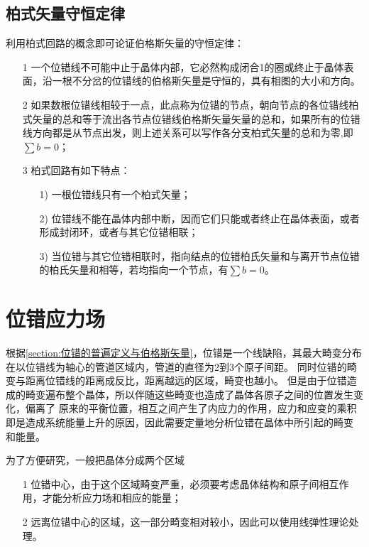                 \subsection{柏式矢量守恒定律}
                        利用柏式回路的概念即可论证伯格斯矢量的守恒定律：
                        \begin{enumerate}
                            \item[1] 一个位错线不可能中止于晶体内部，它必然构成闭合1的圈或终止于晶体表面，沿一根不分岔的位错线的伯格斯矢量是守恒的，具有相图的大小和方向。
                            \item[2] 如果数根位错线相较于一点，此点称为位错的节点，朝向节点的各位错线柏式矢量的总和等于流出各节点位错线伯格斯矢量矢量的总和，如果所有的位错线方向都是从节点出发，则上述关系可以写作各分支柏式矢量的总和为零,即$\sum b=0$；
                            \item[3] 柏式回路有如下特点：
                            \begin{enumerate}
                                \item[1)] 一根位错线只有一个柏式矢量；
                                \item[2)] 位错线不能在晶体内部中断，因而它们只能或者终止在晶体表面，或者形成封闭环，或者与其它位错相联；
                                \item[3)] 当位错与其它位错相联时，指向结点的位错柏氏矢量和与离开节点位错的柏氏矢量和相等，若均指向一个节点，有$\sum b=0$。
                            \end{enumerate} 
                        \end{enumerate}
        
        \section{位错应力场}
            根据\autoref{section:位错的普遍定义与伯格斯矢量}，位错是一个线缺陷，其最大畸变分布在以位错线为轴心的管道区域内，管道的直径为2到3个原子间距。
            同时位错的畸变与距离位错线的距离成反比，距离越远的区域，畸变也越小。
            但是由于位错造成的畸变遍布整个晶体，所以伴随这些畸变也造成了晶体各原子之间的位置发生变化，偏离了
            原来的平衡位置，相互之间产生了内应力的作用，应力和应变的乘积即是造成系统能量上升的原因，因此需要定量地分析位错在晶体中所引起的畸变
            和能量。

            为了方便研究，一般把晶体分成两个区域
            \begin{itemize}
                \item[1] 位错中心，由于这个区域畸变严重，必须要考虑晶体结构和原子间相互作用，才能分析应力场和相应的能量；
                \item[2] 远离位错中心的区域，这一部分畸变相对较小，因此可以使用线弹性理论处理。
            \end{itemize}
            
